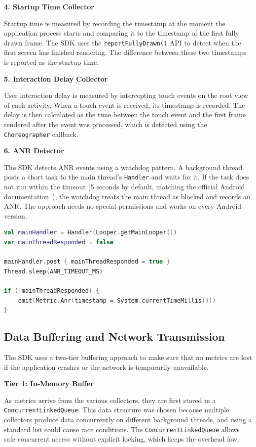 \textbf{4. Startup Time Collector}

Startup time is measured by recording the timestamp at the moment the application process starts and comparing it to the timestamp of the first fully drawn frame. The SDK uses the \texttt{reportFullyDrawn()} API to detect when the first screen has finished rendering. The difference between these two timestamps is reported as the startup time.

\textbf{5. Interaction Delay Collector}

User interaction delay is measured by intercepting touch events on the root view of each activity. When a touch event is received, its timestamp is recorded. The delay is then calculated as the time between the touch event and the first frame rendered after the event was processed, which is detected using the \texttt{Choreographer} callback.

\textbf{6. ANR Detector}

The SDK detects ANR events using a watchdog pattern. A background thread posts a short task to the main thread's \texttt{Handler} and waits for it. If the task does not run within the timeout (5 seconds by default, matching the official Android documentation~\cite{AndroidVitals}), the watchdog treats the main thread as blocked and records an ANR. The approach needs no special permissions and works on every Android version.

\begin{lstlisting}[language=Kotlin, caption={ANR Watchdog — detection logic}]
val mainHandler = Handler(Looper.getMainLooper())
var mainThreadResponded = false

mainHandler.post { mainThreadResponded = true }
Thread.sleep(ANR_TIMEOUT_MS)

if (!mainThreadResponded) {
    emit(Metric.Anr(timestamp = System.currentTimeMillis()))
}
\end{lstlisting}

\subsection{Data Buffering and Network Transmission}

The SDK uses a two-tier buffering approach to make sure that no metrics are lost if the application crashes or the network is temporarily unavailable.

\textbf{Tier 1: In-Memory Buffer}

As metrics arrive from the various collectors, they are first stored in a \texttt{ConcurrentLinkedQueue}. This data structure was chosen because multiple collectors produce data concurrently on different background threads, and using a standard list could cause race conditions. The \texttt{ConcurrentLinkedQueue} allows safe concurrent access without explicit locking, which keeps the overhead low.

